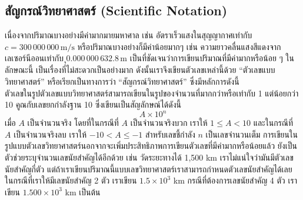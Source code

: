 
\renewcommand{\theequation}{\thechapter.\arabic{equation}}

\renewcommand{\thesection}{ก}
\renewcommand{\theequation}{\thesection.\arabic{equation}}
 \setcounter{equation}{0}
\label{SecApp1}
\setcounter{subsection}{0}

\subsection[สัญกรณ์วิทยาศาสตร์]{สัญกรณ์วิทยาศาสตร์ (Scientific Notation)}
\noindent เนื่องจากปริมาณบางอย่างมีค่ามากมายมหาศาล เช่น อัตราเร็วแสงในสุญญากาศเท่ากับ $c=300\,000\,000\,\mathrm{m}/\mathrm{s}$ หรือปริมาณบางอย่างก็มีค่าน้อยมากๆ เช่น ความยาวคลื่นแสงสีแดงจากเลเซอร์นีออนเท่ากับ $ุ0.000\,000\,632.8\,\mathrm{m}$ เป็นที่ชัดเจนว่าการเขียนปริมาณที่มีค่ามากหรือน้อย ๆ ในลักษณะนี้ เป็นเรื่องที่ไม่สะดวกเป็นอย่างมาก ดังนั้นเราจึงเขียนตัวเลขเหล่านี้ด้วย ``ตัวเลขแบบวิทยาศาสตร์'' หรือเรียกเป็นทางการว่า ``สัญกรณ์วิทยาศาสตร์'' ซึ่งมีหลักการดังนี้\\

\noindent ตัวเลขในรูปตัวเลขแบบวิทยาศาสตร์สามารถเขียนในรูปของจำนวนที่มากกว่าหรือเท่ากับ 1 แต่น้อยกว่า 10 คูณกับเลขยกกำลังฐาน 10  ซึ่งเขียนเป็นสัญลักษณ์ได้ดังนี้
\begin{equation}\label{EqnI.1}
  A\times 10^n
\end{equation}
เมื่อ $A$ เป็นจำนวนจริง โดยที่ในกรณีที่ $A$  เป็นจำนวนจริงบวก เราให้ $1\le A<10$ และในกรณีที่ $A$ เป็นจำนวนจริงลบ เราให้ $-10<A\le -1$  สำหรับเลขชี้กำลัง $n$ เป็นเลขจำนวนเต็ม การเขียนในรูปแบบตัวเลขวิทยาศาสตร์นอกจากจะเพิ่มประสิทธิภาพการเขียนตัวเลขที่มีค่ามากหรือน้อยแล้ว ยังเป็นตัวช่วยระบุจำนวนเลขนัยสำคัญได้อีกด้วย เช่น วัดระยะทางได้ 1,500 km เราไม่แน่ใจว่ามันมีตัวเลขนัยสำคัญกี่ตัว แต่ถ้าเราเขียนปริมาณนี้แบบเลขวิทยาศาสตร์เราสามารถกำหนดตัวเลขนัยสำคัญได้เลย ในกรณีที่เราให้มีเลขนัยสำคัญ 2 ตัว เราเขียน $1.5\times 10^3$ km กรณีที่ต้องการเลขนัยสำคัญ 4 ตัว เราเขียน $1.500\times 10^3$ km เป็นต้น


